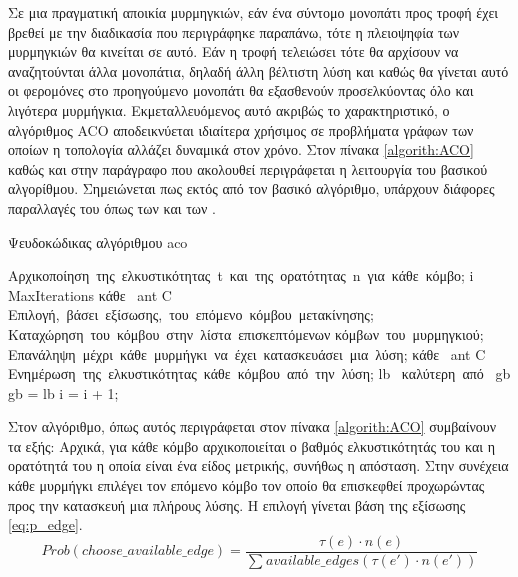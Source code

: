 \documentclass{assignment}
\begin{document}
Σε μια πραγματική αποικία μυρμηγκιών, εάν ένα σύντομο μονοπάτι προς τροφή έχει
βρεθεί με την διαδικασία που περιγράφηκε παραπάνω, τότε η πλειοψηφία των
μυρμηγκιών θα κινείται σε αυτό. Εάν η τροφή τελειώσει τότε θα αρχίσουν να 
αναζητούνται άλλα μονοπάτια, δηλαδή άλλη βέλτιστη λύση και καθώς θα γίνεται
αυτό οι φερομόνες στο προηγούμενο μονοπάτι θα εξασθενούν προσελκύοντας όλο και
λιγότερα μυρμήγκια. Εκμεταλλευόμενος αυτό ακριβώς το χαρακτηριστικό, ο
αλγόριθμος ACO αποδεικνύεται ιδιαίτερα χρήσιμος σε προβλήματα γράφων των οποίων
η τοπολογία αλλάζει δυναμικά στον χρόνο. Στον πίνακα \ref{algorith:ACO}
καθώς και στην παράγραφο που ακολουθεί περιγράφεται η λειτουργία του βασικού
αλγορίθμου. Σημειώνεται πως εκτός από τον βασικό αλγόριθμο, υπάρχουν διάφορες
παραλλαγές του όπως των \citet{merkle2002ant} και των \citet{yaseen2008ant}.
\begin{algorithm}                        %
\caption{Ψευδοκώδικας αλγόριθμου aco}          %
\label{algorith:ACO}                      %
\begin{program}
\mbox{Αρχικοποίηση της ελκυστικότητας t και της ορατότητας n για κάθε κόμβο};
  \WHILE i \lt MaxIterations \DO
    \FOR \mbox{κάθε } ant \in C \DO
    \mbox{Επιλογή, βάσει εξίσωσης, του επόμενο κόμβου μετακίνησης;}
    \mbox{Καταχώρηση του κόμβου στην λίστα επισκεπτόμενων} 
    \mbox{κόμβων του μυρμηγκιού;}
    \mbox{Eπανάληψη μέχρι κάθε μυρμήγκι να έχει κατασκευάσει μια λύση;}
  \END
  \FOR \mbox{κάθε } ant \in C \DO
  \mbox{Ενημέρωση της ελκυστικότητας κάθε κόμβου από την λύση;}
  \END
  \IF lb \mbox{ καλύτερη από } gb
    \THEN gb = lb
   \FI
   i = i + 1;
  \END
\end{program}
\end{algorithm}

Στον αλγόριθμο, όπως αυτός περιγράφεται στον πίνακα \ref{algorith:ACO}\cite{web:ucla15}
συμβαίνουν τα εξής: Αρχικά, για κάθε κόμβο αρχικοποιείται ο βαθμός
ελκυστικότητάς του και η ορατότητά του η οποία είναι ένα είδος μετρικής, συνήθως
η απόσταση. Στην συνέχεια κάθε μυρμήγκι επιλέγει τον επόμενο κόμβο τον οποίο
θα επισκεφθεί προχωρώντας προς την κατασκευή μια πλήρους λύσης. Η επιλογή
γίνεται βάση της εξίσωσης \ref{eq:p_edge}.
\begin{equation}
\label{eq:p_edge}
Prob(choose\_available\_edge) = \frac{\tau(e) \cdot n(e)}{\sum_{} available\_edges(\tau(e') \cdot n(e'))}
\end{equation}
\end{document}
